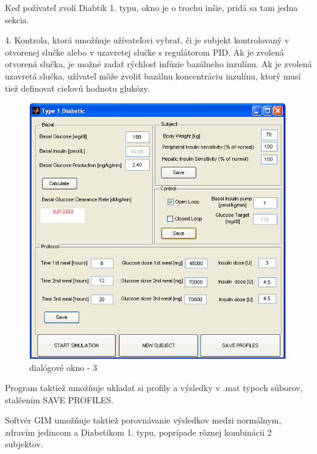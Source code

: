 Keď požívateľ zvolí  Diabtik 1. typu, okno je o trochu inšie, pridá sa tam jedna sekcia.

4. Kontrola, ktorá umožňuje užívateľovi vybrať, či je subjekt kontrolovaný v otvorenej slučke alebo v uzavretej slučke s regulátorom PID. Ak je zvolená otvorená slučka, je možné zadať rýchlosť infúzie bazálneho inzulínu. Ak je zvolená uzavretá slučka, užívateľ môže zvoliť bazálnu koncentráciu inzulínu, ktorý musí tiež definovať cieľovú hodnotu glukózy. 

\begin{figure}[h]
\includegraphics[scale=0.5]{ob-4.PNG}
\caption{dialógové okno - 3 \cite{2007}}
\end{figure}

Program taktiež umožňuje ukladať si profily a výsledky v .mat typoch súborov, stalčením SAVE PROFILES.\cite{2007}

Softvér GIM umožňuje taktiež porovnávanie výsledkov medzi normálnym, zdravím jedincom a Diabetikom 1. typu, poprípade rôznej kombinácii 2 subjektov.\cite{2007}